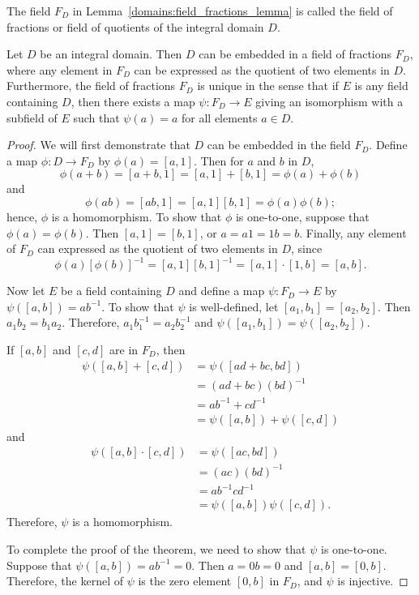 \medskip

The field $F_D$ in Lemma~\ref{domains:field_fractions_lemma} is called the {\bfi field of
fractions\/} or {\bfi field of
quotients\/} of the integral domain $D$.  
 

\begin{theorem}\label{domains:field_of_quotients_ther}
Let $D$ be an integral domain.  Then $D$ can be embedded in a field of
fractions $F_D$, where any element in $F_D$ can be expressed as the
quotient of two elements in $D$.  Furthermore, the field of fractions
$F_D$ is unique in the sense that if $E$ is any field containing $D$,
then there exists a map $\psi : F_D \rightarrow E$ giving an isomorphism
with a subfield of $E$ such that $\psi(a) = a$ for all elements $a \in
D$. 
\end{theorem}
 

\begin{proof}
We will first demonstrate that $D$ can be embedded in the field 
$F_D$.  Define a map $\phi : D \rightarrow F_D$ by $\phi(a) 
= [a, 1]$.  Then for $a$ and $b$ in $D$,
\[
\phi( a + b ) = [a+b, 1] = [a, 1] + [b, 1] = \phi(a ) + \phi(b)
\]							       
and
\[
\phi( a b ) = [a b, 1] = [a, 1]  [b, 1] = \phi(a ) \phi(b);
\]
hence, $\phi$ is a homomorphism.  To show that $\phi$ is one-to-one,
suppose that $\phi(a) = \phi( b)$.  Then $[a, 1] = [b, 1]$, or $a = a1
= 1b = b$. Finally, any element of $F_D$ can expressed as the quotient
of two elements in $D$, since   
\[
\phi(a) [\phi(b)]^{-1} = [a, 1] [b, 1]^{-1} = [a, 1] \cdot [1, b]
= [a, b].
\]

 
Now let $E$ be a field containing $D$ and define a map $\psi :F_D
\rightarrow E$ by $\psi([a, b]) = a b^{-1}$.  To show that $\psi$ is
well-defined, let $[a_1, b_1] = [a_2, b_2]$. Then $a_1 b_2 = b_1 a_2$.
Therefore, $a_1 b_1^{-1} = a_2 b_2^{-1}$  and $\psi( [a_1, b_1]) =
\psi( [a_2, b_2])$.
 

If $[a, b ]$ and $[c, d]$ are in $F_D$, then
\begin{align*}
\psi( [a, b] + [c, d] ) 
& = \psi( [ad + b c, b d ] ) \\
& =  (ad +b c)(b d)^{-1} \\
& = a b^{-1} + c d^{-1} \\
& = \psi( [a, b] ) + \psi( [c, d] )
\end{align*}
and
\begin{align*}
\psi( [a, b] \cdot [c, d] ) & = \psi( [ac, b d ] )\\
 & =  (ac)(b d)^{-1}\\
& = a b^{-1}  c d^{-1}\\
 & = \psi( [a, b] )  \psi( [c, d] ).
\end{align*}
Therefore, $\psi$ is a homomorphism.
 

To complete the proof of the theorem, we need to show that $\psi$ is
one-to-one.  Suppose that $\psi( [a, b] ) = ab^{-1} = 0$. Then $a =
0b = 0$ and $[a, b] = [0, b]$.  Therefore, the kernel of $\psi$ is
the zero element $[ 0, b]$ in $F_D$, and $\psi$ is injective.
\mbox{\hspace{1in}}
\end{proof}
 

